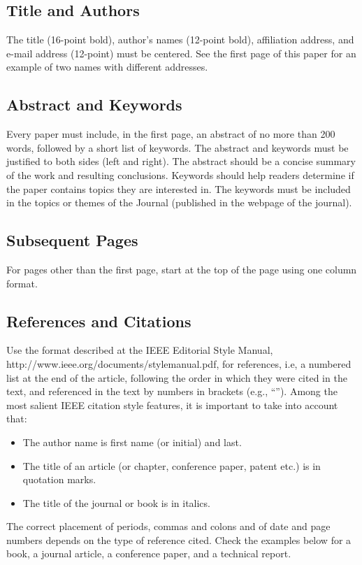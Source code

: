 \documentclass{cleiej}
\begin{document}
\subsection{Title and Authors}
The title (16-point bold), author's names (12-point bold), affiliation address, 
and e-mail address (12-point) must be centered. See the first page of this paper 
for an example of two names with different addresses. 

\subsection{Abstract and Keywords}
Every paper must include, in the first page, an abstract of no more than 200 words, 
followed by a short list of keywords. The abstract and keywords must be justified to 
both sides (left and right). The abstract should be a concise summary of the work 
and resulting conclusions. Keywords should help readers determine if the paper contains 
topics they are interested in. The keywords must be included in the topics or themes 
of the Journal (published in the webpage of the journal).

\subsection{Subsequent Pages}
For pages other than the first page, start at the top of the page using one column format. 

\subsection{References and Citations}
Use the format described at the IEEE Editorial Style Manual, http://www.ieee.org/documents/stylemanual.pdf, for references, i.e, a numbered list at the end of the article, following the order in which they were cited in the text, and referenced in the text by numbers in brackets (e.g., ``\cite{IEEEhowto:IEEEtranpage}''). Among the most salient IEEE citation style features, it is important to take into account that:
\begin{itemize}
\item The author name is first name (or initial) and last. 
\item The title of an article (or chapter, conference paper, patent etc.) is in quotation marks.
\item  The title of the journal or book is in italics.
\end{itemize}

The correct placement of periods, commas and colons and of date and page numbers depends on the type of reference cited. Check the examples below for a book, a journal article, a conference paper, and a technical report. 
 
\end{document}
